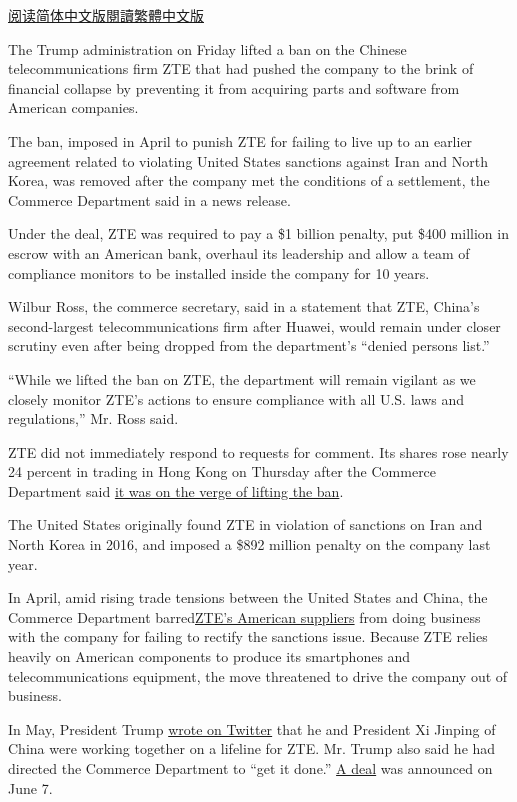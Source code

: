 \href{https://cn.nytimes.com/business/20180716/zte-ban-trump/}{阅读简体中文版}\href{https://cn.nytimes.com/business/20180716/zte-ban-trump/zh-hant/}{閱讀繁體中文版}

The Trump administration on Friday lifted a ban on the Chinese
telecommunications firm ZTE that had pushed the company to the brink of
financial collapse by preventing it from acquiring parts and software
from American companies.

The ban, imposed in April to punish ZTE for failing to live up to an
earlier agreement related to violating United States sanctions against
Iran and North Korea, was removed after the company met the conditions
of a settlement, the Commerce Department said in a news release.

Under the deal, ZTE was required to pay a \$1 billion penalty, put \$400
million in escrow with an American bank, overhaul its leadership and
allow a team of compliance monitors to be installed inside the company
for 10 years.

Wilbur Ross, the commerce secretary, said in a statement that ZTE,
China's second-largest telecommunications firm after Huawei, would
remain under closer scrutiny even after being dropped from the
department's ``denied persons list.''

``While we lifted the ban on ZTE, the department will remain vigilant as
we closely monitor ZTE's actions to ensure compliance with all U.S. laws
and regulations,'' Mr. Ross said.

ZTE did not immediately respond to requests for comment. Its shares rose
nearly 24 percent in trading in Hong Kong on Thursday after the Commerce
Department said
\href{https://twitter.com/CommerceGov/status/1017110327887003648}{it was
on the verge of lifting the ban}.

The United States originally found ZTE in violation of sanctions on Iran
and North Korea in 2016, and imposed a \$892 million penalty on the
company last year.

In April, amid rising trade tensions between the United States and
China, the Commerce Department
barred\href{https://www.nytimes.com/2018/06/07/business/us-china-zte-deal.html}{ZTE's
American suppliers} from doing business with the company for failing to
rectify the sanctions issue. Because ZTE relies heavily on American
components to produce its smartphones and telecommunications equipment,
the move threatened to drive the company out of business.

In May, President Trump
\href{https://www.nytimes.com/2018/05/13/business/trump-vows-to-save-jobs-at-chinas-zte-lost-after-us-sanctions.html}{wrote
on Twitter} that he and President Xi Jinping of China were working
together on a lifeline for ZTE. Mr. Trump also said he had directed the
Commerce Department to ``get it done.''
\href{https://www.commerce.gov/news/press-releases/2018/06/secretary-ross-announces-14-billion-zte-settlement-zte-board-management}{A
deal} was announced on June 7.

